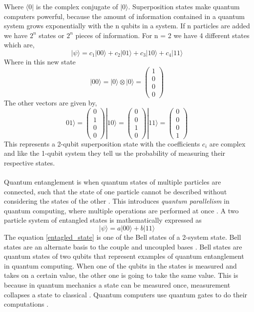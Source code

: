 \documentclass{Assignment}
\begin{document}
Where $\langle 0|$ is the complex conjugate of $|0\rangle$.
Superposition states make quantum computers powerful, because the amount of information contained in a quantum system grows exponentially with the n qubits in a system.
If n particles are added we have $2^n$ states or $2^n$ pieces of information. 
For n = 2 we have 4 different states which are,
\begin{equation}
	|\psi\rangle =c_1 |00\rangle+c_2 |01\rangle+c_3 |10\rangle+ c_4 |11\rangle
\end{equation}
Where in this new state \begin{equation}|00\rangle = |0\rangle\otimes|0\rangle  =	\begin{pmatrix}
		1\\0\\0\\0
\end{pmatrix}\end{equation}
The other vectors are given by,
$$01\rangle =	\begin{pmatrix}
	0\\1\\0\\0
\end{pmatrix}|10\rangle =	\begin{pmatrix}
	0\\0\\1\\0
\end{pmatrix}|11\rangle =	\begin{pmatrix}
	0\\0\\0\\1
\end{pmatrix} $$
This represents a 2-qubit superposition state with the coefficients $c_i$ are complex and like the 1-qubit system they tell us the probability of measuring their respective states.
\\\\
Quantum entanglement is when quantum states of multiple particles are connected, such that the state of one particle cannot be described without considering the states of the other \cite{Horodecki_2009}.
This introduces \textit{quantum parallelism} in quantum computing, where multiple operations are performed at once \cite{mcintyre_quantum_2012}.
A two particle system of entangled states is mathematically expressed as
\begin{equation}
	|\psi \rangle = a|00\rangle + b|11\rangle
	\label{entagled_state}
\end{equation}
The equation \eqref{entagled_state} is one of the Bell states of a 2-system state.
Bell states are an alternate basis to the couple and uncoupled bases \cite{mcintyre_quantum_2012}.
Bell states are quantum states of two qubits that represent examples of quantum entanglement in quantum computing.
When one of the qubits in the states is measured and takes on a certain value, the other one is going to take the same value.
This is because in quantum mechanics a state can be measured once, measurement collapses a state to classical \cite{mcintyre_quantum_2012}.
Quantum computers use quantum gates to do their computations \cite{AndrewSteane}.
\end{document}
